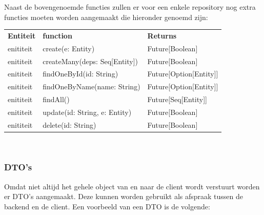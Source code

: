 Naast de bovengenoemde functies zullen er voor een enkele repository nog extra functies moeten worden aangemaakt die hieronder genoemd zijn:

\begin{tabular}{lll}
    \textbf{Entiteit} & \textbf{function} & \textbf{Returns}\\
    enititeit & create(e: Entity) & Future[Boolean] \\
    enititeit & createMany(deps: Seq[Entity])& Future[Boolean]\\
    enititeit & findOneById(id: String) & Future[Option[Entity]]\\
    enititeit & findOneByName(name: String) & Future[Option[Entity]]\\
    enititeit & findAll() & Future[Seq[Entity]] \\
    enititeit & update(id: String, e: Entity) & Future[Boolean]\\
    enititeit & delete(id: String) & Future[Boolean] \\
\end{tabular} \\




\subsubsection{DTO's}
Omdat niet altijd het gehele object van en naar de client wordt verstuurt worden er DTO's aangemaakt. Deze kunnen worden gebruikt als afspraak tussen de backend en de client. Een voorbeeld van een DTO is de volgende:

